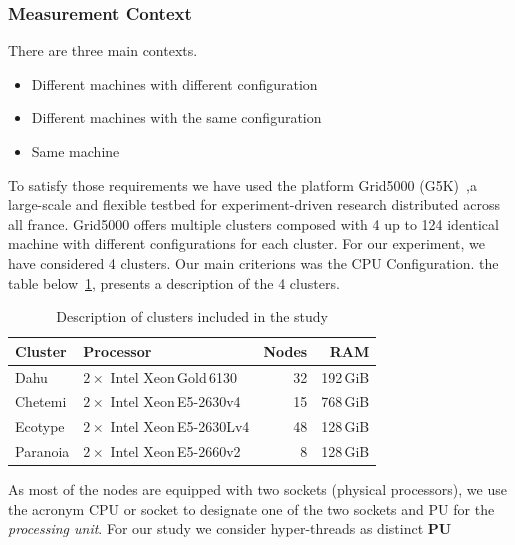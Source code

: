 \subsubsection{Measurement Context}
There are three main contexts.
\begin{itemize}
    \item Different machines with different configuration
    \item Different machines with the same configuration
    \item Same machine
\end{itemize}

To satisfy those requirements we have used the platform Grid5000 (G5K)~\cite{grid5000,margery:hal-00965708},a large-scale and flexible testbed for experiment-driven research distributed across all france.
Grid5000 offers  multiple clusters composed with 4 up to 124 identical machine with different configurations for each cluster.
For our experiment, we have considered 4 clusters.
Our main criterions was the CPU Configuration.
the table below~\ref{table:g5k}, presents a description of the 4 clusters.

\begin{table}[!hbt]
    \centering
    \caption{Description of clusters included in the study}
    \label{table:g5k}
    \small
    \begin{tabular}{|l|l|r|r|}
        \hline
        \textbf{Cluster}  & \textbf{Processor}               & \textbf{Nodes} & \textbf{RAM} \\
        \hline
        \hline
        \textsf{Dahu}     & $2\times$ Intel Xeon\,Gold\,6130 & 32             & 192\,GiB     \\
        \hline
        \textsf{Chetemi}  & $2\times$ Intel Xeon\,E5-2630v4  & 15             & 768\,GiB     \\
        \hline
        \textsf{Ecotype}  & $2\times$ Intel Xeon\,E5-2630Lv4 & 48             & 128\,GiB     \\
        \hline
        \textsf{Paranoia} & $2\times$ Intel Xeon\,E5-2660v2  & 8              & 128\,GiB     \\
        \hline
    \end{tabular}
\end{table}

As most of the nodes are equipped with two sockets (physical processors), we use the acronym \textsf{CPU} or \textsf{socket} to designate one of the two sockets and \textsf{PU} for the \emph{processing unit}. For our study we consider hyper-threads as distinct \textbf{PU}

